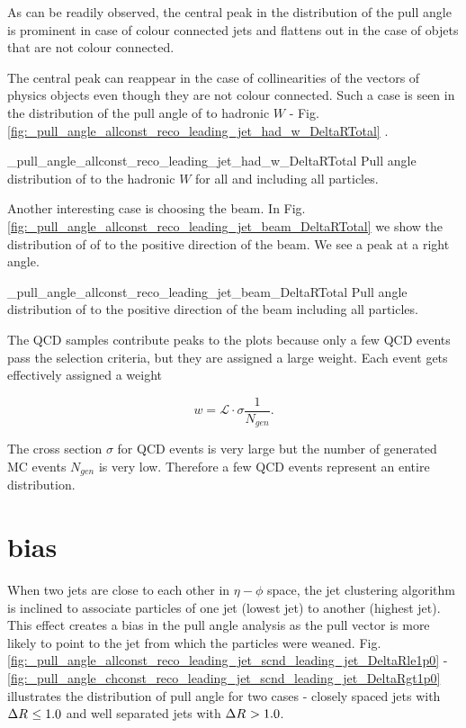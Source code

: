 As can be readily observed, the central peak in the distribution of the pull angle is prominent in case of colour connected jets and flattens out in the case of objets that are not colour connected.

The central peak can reappear in the case of collinearities of the vectors of physics objects even though they are not colour connected. Such a case is seen in the distribution of the pull angle of \leadingjet to hadronic $W$ - Fig. \ref{fig:_pull_angle_allconst_reco_leading_jet_had_w_DeltaRTotal}
. 

          {_pull_angle_allconst_reco_leading_jet_had_w_DeltaRTotal}
          {Pull angle distribution of \leadingjet to the hadronic $W$ for all \DeltaR and including all particles.}

Another interesting case is choosing the beam. In Fig. \ref{fig:_pull_angle_allconst_reco_leading_jet_beam_DeltaRTotal} we show the distribution of \pullangle of \leadingjet to the positive direction of the beam. We see a peak at a right angle.

          {_pull_angle_allconst_reco_leading_jet_beam_DeltaRTotal}
          {Pull angle distribution of \leadingjet to the positive direction of the beam including all particles.}

The QCD samples contribute peaks to the plots because only a few QCD events pass the selection criteria, but they are assigned a large weight. Each event gets effectively assigned a weight

\begin{equation}
w=\mathcal{L}\cdot\sigma\frac{1}{N_{gen}}.
\end{equation}

The cross section $\sigma$ for QCD events is very large but the number of generated MC events $N_{gen}$ is very low. Therefore a few QCD events represent an entire distribution.

\section{\DeltaR bias}

When two jets are close to each other in $\eta-\phi$ space, the jet clustering algorithm is inclined to associate particles of one jet (lowest \pt jet) to another (highest \pt jet). This effect creates a bias in the pull angle analysis as the pull vector is more likely to point to the jet from which the particles were weaned. Fig. \ref{fig:_pull_angle_allconst_reco_leading_jet_scnd_leading_jet_DeltaRle1p0} - \ref{fig:_pull_angle_chconst_reco_leading_jet_scnd_leading_jet_DeltaRgt1p0} illustrates the distribution of pull angle for two cases - closely spaced jets with $\Delta R^{}\leq1.0$ and well separated jets with $\Delta R^{}>1.0$.

